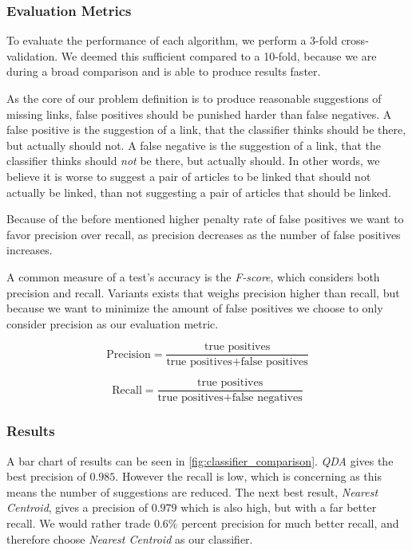 \subsubsection{Evaluation Metrics}\label{evaluation_metric}
To evaluate the performance of each algorithm, we perform a 3-fold cross-validation. We deemed this sufficient compared to a 10-fold, because we are during a broad comparison and is able to produce results faster.

As the core of our problem definition is to produce reasonable suggestions of missing links, false positives should be punished harder than false negatives. A false positive is the suggestion of a link, that the classifier thinks should be there, but actually should not. A false negative is the suggestion of a link, that the classifier thinks should \emph{not} be there, but actually should. In other words, we believe it is worse to suggest a pair of articles to be linked that should not actually be linked, than not suggesting a pair of articles that should be linked.

Because of the before mentioned higher penalty rate of false positives we want to favor precision over recall, as precision decreases as the number of false positives increases.

A common measure of a test's accuracy is the \emph{F-score}, which considers both precision and recall. Variants exists that weighs precision higher than recall, but because we want to minimize the amount of false positives we choose to only consider precision as our evaluation metric.

\begin{equation}\label{eq:precision}
\text{Precision} = \frac{\text{true positives}}{\text{true positives} + \text{false positives}}
\end{equation}

\begin{equation}\label{eq:recall}
\text{Recall} = \frac{\text{true positives}}{\text{true positives} + \text{false negatives}}
\end{equation}


\subsubsection{Results}
A bar chart of results can be seen in \cref{fig:classifier_comparison}. \emph{QDA} gives the best precision of $0.985$. However the recall is low, which is concerning as this means the number of suggestions are reduced. The next best result, \emph{Nearest Centroid}, gives a precision of $0.979$ which is also high, but with a far better recall. We would rather trade $0.6\%$ percent precision for much better recall, and therefore choose \emph{Nearest Centroid} as our classifier.

